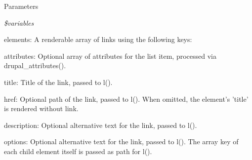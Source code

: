 \begin{DoxyParams}{Parameters}
\item[{\em \$variables}]
\begin{DoxyItemize}
\item elements: A renderable array of links using the following keys:
\begin{DoxyItemize}
\item attributes: Optional array of attributes for the list item, processed via drupal\_\-attributes().
\item title: Title of the link, passed to l().
\item href: Optional path of the link, passed to l(). When omitted, the element's 'title' is rendered without link.
\item description: Optional alternative text for the link, passed to l().
\item options: Optional alternative text for the link, passed to l(). The array key of each child element itself is passed as path for l(). 
\end{DoxyItemize}
\end{DoxyItemize}\end{DoxyParams}
